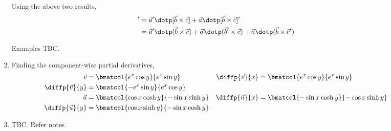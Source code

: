 \begin{enumerate}
          Using the above two results,
          \begin{align}
              [\vec{a} \dotp (\vec{b} \times \vec{c})]' & = \vec{a}' \dotp
              [\vec{b} \times \vec{c}] + \vec{a} \dotp [\vec{b} \times \vec{c}]' \\
                                                        & = \vec{a}' \dotp
              (\vec{b} \times \vec{c}) + \vec{a} \dotp (\vec{b}' \times \vec{c})
              + \vec{a} \dotp (\vec{b} \times \vec{c}')
          \end{align}

          Examples TBC.

    \item Finding the component-wise partial derivatives,
          \begin{align}
              \vec{v}            & = \bmatcol{e^x \cos y}{e^x \sin y}           &
              \diffp{\vec{v}}{x} & = \bmatcol{e^x \cos y}{e^x \sin y}             \\
              \diffp{\vec{v}}{y} & = \bmatcol{-e^x \sin y}{e^x \cos y}            \\
              \vec{u}            & = \bmatcol{\cos x \cosh y}{-\sin x \sinh y}  &
              \diffp{\vec{u}}{x} & = \bmatcol{-\sin x \cosh y}{-\cos x \sinh y}   \\
              \diffp{\vec{u}}{y} & = \bmatcol{\cos x \sinh y}{-\sin x \cosh y}
          \end{align}

    \item TBC. Refer notes.
\end{enumerate}